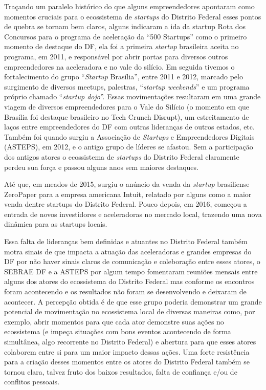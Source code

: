 Traçando um paralelo histórico do que alguns empreendedores apontaram como momentos cruciais para o ecossistema de \textit{startups} do Distrito Federal esses pontos de quebra se tornam bem claros, alguns indicaram a ida da startup Rota dos Concursos para o programa de aceleração da ``500 Startups'' como o primeiro momento de destaque do DF, ela foi a primeira \textit{startup} brasileira aceita no programa, em 2011, e responsável por abrir portas para diversos outros empreendedores na aceleradora e no vale do silício. Em seguida tivemos o fortalecimento do grupo ``\textit{Startup} Brasília'', entre 2011 e 2012, marcado pelo surgimento de diversos meetups, palestras, ``\textit{startup weekends}'' e um programa próprio chamado ``\textit{startup dojo}''. Essas movimentações resultaram em uma grande viagem de diversos empreendedores para o Vale do Silício (o momento em que Brasília foi destaque brasileiro no Tech Crunch Disrupt), um estreitamento de laços entre empreendedores do DF com outras lideranças de outros estados, etc. Também foi quando surgiu a Associação de \textit{Startups} e Empreendedores Digitais (ASTEPS), em 2012, e o antigo grupo de líderes se afastou. Sem a participação dos antigos atores o ecossistema de \textit{startups} do Distrito Federal claramente perdeu sua força e passou alguns anos sem maiores destaques.

Até que, em meados de 2015, surgiu o anúncio da venda da \textit{startup} brasiliense ZeroPaper para a empresa americana Intuit, relatado por alguns como a maior venda dentre startups do Distrito Federal. Pouco depois, em 2016, começou a entrada de novos investidores e aceleradoras no mercado local, trazendo uma nova dinâmica para as startups locais.

Essa falta de lideranças bem definidas e atuantes no Distrito Federal também motra sinais de que impacta a atuação das aceleradoras e grandes empresas do DF por não haver sinais claros de comunicação e coleboração entre esses atores, o SEBRAE DF e a ASTEPS por algum tempo fomentaram reuniões mensais entre alguns dos atores do ecossistema do Distrito Federal mas conforme os encontros foram acontecendo e os resultados não foram se desenvolvendo e deixaram de acontecer. A percepção obtida é de que esse grupo poderia demonstrar um grande potencial de movimentação no ecossistema local de diversas maneiras como, por exemplo, abrir momentos para que cada ator demonstre suas ações no ecossistema (e impeça situações com bons eventos acontecendo de forma simultânea, algo recorrente no Distrito Federal) e abertura para que esses atores colaborem entre si para um maior impacto dessas ações. Uma forte resistência para a criação desses momentos entre os atores do Distrito Federal também se tornou clara, talvez fruto dos baixos resultados, falta de confiança e/ou de conflitos pessoais.

